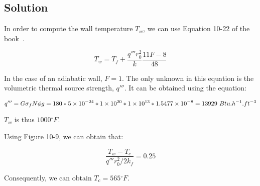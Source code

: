 \subsection{Solution}


In order to compute the wall temperature $T_w$, we can use Equation 10-22 of the book~\cite{book01}.

\begin{equation}
T_w = T_f + \frac{q'''r_0^2}{k}\frac{11F-8}{48}
\end{equation}

In the case of an adiabatic wall, $F = 1$. The only unknown in this equation is the volumetric thermal source strength, $q'''$. It can be obtained using the equation:

\begin{equation}
q''' = G \sigma_f N \phi g = 180 * \text{\num{5e-24}} * \text{\num{1e20}} * \text{\num{1e13}} * \text{\num{1.5477e-8}} = 13929\ Btu.h^{-1}.ft^{-3}
\end{equation}

$T_w$ is thus $1000{}^\circ F$.

Using Figure 10-9, we can obtain that:

\begin{equation}
\frac{T_w - T_c}{q'''r_0^2/2k_f} = 0.25
\end{equation}

Consequently, we can obtain $T_c = 565{}^\circ F$.
